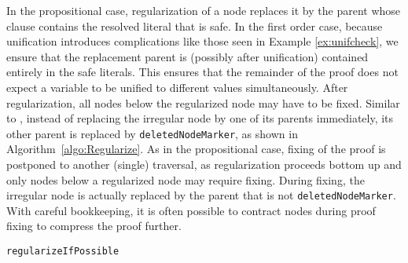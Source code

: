 In the propositional case, regularization of a node replaces it by the parent whose clause contains the resolved literal that is safe. In the first order case, because unification introduces complications like those seen in Example \ref{ex:unifcheck}, we ensure that the replacement parent is (possibly after unification) contained entirely in the safe literals. This ensures that the remainder of the proof does not expect a variable to be unified to different values simultaneously. After regularization, all nodes below the regularized node may have to be fixed. 
Similar to {\RPI}, instead of replacing the irregular node by one of its parents immediately, 
its other parent is replaced by \texttt{deletedNodeMarker}, as shown in Algorithm~\ref{algo:Regularize}.
As in the propositional case, fixing of the proof is postponed to another (single) traversal, as regularization proceeds bottom up and only nodes below a regularized node may require fixing.
During fixing, the irregular node is actually replaced by the parent that is not \texttt{deletedNodeMarker}. 
With careful bookkeeping, it is often possible to contract nodes during proof fixing to compress the proof further.


\begin{algorithm}[bt]
\begin{footnotesize}



\BlankLine
\caption{\label{algo:Regularize} \texttt{regularizeIfPossible}}
\end{footnotesize}
\end{algorithm}


